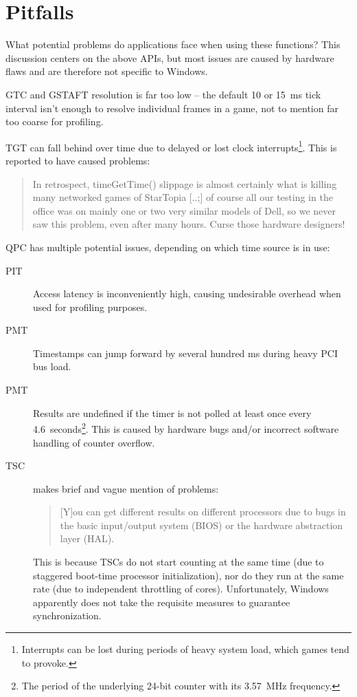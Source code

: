 \documentclass[a4paper,12pt,pdftex]{article}
\begin{document}
\section{Pitfalls}
\label{sec:pitfalls}

What potential problems do applications face when using these functions? This discussion centers on the above APIs, but most issues are caused by hardware flaws and are therefore not specific to Windows.

GTC and GSTAFT resolution is far too low -- the default 10 or 15~ms tick interval isn't enough to resolve individual frames in a game, not to mention far too coarse for profiling.

TGT can fall behind over time due to delayed or lost clock interrupts\footnote{Interrupts can be lost during periods of heavy system load, which games tend to provoke.}. This is reported to have caused problems:
\begin{quote}
In retrospect, timeGetTime() slippage is almost certainly what is killing many networked games of StarTopia [..;] of course all our testing in the office was on mainly one or two very similar models of Dell, so we never saw this problem, even after many hours. Curse those hardware designers!

\citet{tgtProb}
\end{quote}

QPC has multiple potential issues, depending on which time source is in use:
\begin{description}
  \item[PIT] Access latency is inconveniently high, causing undesirable overhead when used for profiling purposes.
	\item[PMT] Timestamps can jump forward by several hundred ms during heavy PCI bus load. \citep{qpcJump}
	\item[PMT] Results are undefined if the timer is not polled at least once every 4.6~seconds\footnote{The period of the underlying 24-bit counter with its 3.57~MHz frequency.}. This is caused by hardware bugs and/or incorrect software handling of counter overflow.
	\item[TSC] \citet{msdnQPC} makes brief and vague mention of problems:
\begin{quote}
[Y]ou can get different results on different processors due to bugs in the basic input/output system (BIOS) or the hardware abstraction layer (HAL).
\end{quote}
This is because TSCs do not start counting at the same time (due to staggered boot-time processor initialization), nor do they run at the same rate (due to independent throttling of cores). Unfortunately, Windows apparently does not take the requisite measures to guarantee synchronization.
\end{description}
\end{document}
